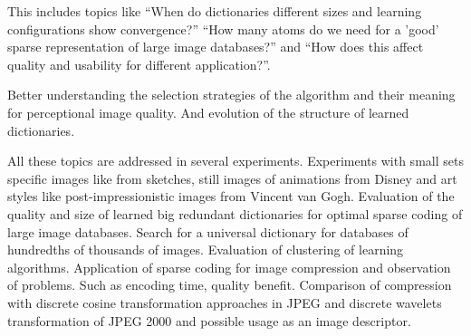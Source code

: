 This includes topics like ``When do dictionaries different sizes and
learning configurations show convergence?'' ``How many atoms do we need  for a
'good' sparse representation of large image databases?''  and ``How does this
affect quality and usability for different application?''. 

Better understanding the selection strategies of the algorithm and their
meaning for perceptional image quality. And evolution of the structure of
learned dictionaries. 

All these topics are addressed in several experiments. Experiments with
small sets specific images like from sketches, still images of animations from
Disney and art styles like post-impressionistic images from Vincent van Gogh.
Evaluation of the quality and size of learned big redundant dictionaries for
optimal sparse coding of large image databases. Search for a universal
dictionary for databases of hundredths of thousands of images. Evaluation of
clustering of learning algorithms. Application of sparse coding for image
compression and observation of problems. Such as encoding time, quality benefit.
Comparison of compression with discrete cosine transformation approaches in JPEG
and discrete wavelets transformation of JPEG 2000 and possible usage as an image
descriptor.







